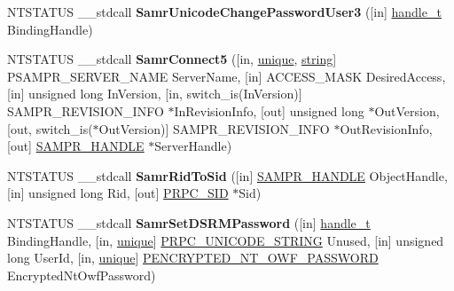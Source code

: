 \begin{DoxyCompactItemize}
\item 
\mbox{\label{interfacesamr_a1f6cdc67440027ac7df65a054462f17d}} 
N\+T\+S\+T\+A\+T\+US \+\_\+\+\_\+stdcall {\bfseries Samr\+Unicode\+Change\+Password\+User3} (\mbox{[}in\mbox{]} \hyperlink{interfacevoid}{handle\+\_\+t} Binding\+Handle)
\item 
\mbox{\label{interfacesamr_ae502c2f0359049ce4ec5290164c0fe34}} 
N\+T\+S\+T\+A\+T\+US \+\_\+\+\_\+stdcall {\bfseries Samr\+Connect5} (\mbox{[}in, \hyperlink{interfaceunique}{unique}, \hyperlink{structstring}{string}\mbox{]} P\+S\+A\+M\+P\+R\+\_\+\+S\+E\+R\+V\+E\+R\+\_\+\+N\+A\+ME Server\+Name, \mbox{[}in\mbox{]} A\+C\+C\+E\+S\+S\+\_\+\+M\+A\+SK Desired\+Access, \mbox{[}in\mbox{]} unsigned long In\+Version, \mbox{[}in, switch\+\_\+is(In\+Version)\mbox{]} S\+A\+M\+P\+R\+\_\+\+R\+E\+V\+I\+S\+I\+O\+N\+\_\+\+I\+N\+FO $\ast$In\+Revision\+Info, \mbox{[}out\mbox{]} unsigned long $\ast$Out\+Version, \mbox{[}out, switch\+\_\+is($\ast$Out\+Version)\mbox{]} S\+A\+M\+P\+R\+\_\+\+R\+E\+V\+I\+S\+I\+O\+N\+\_\+\+I\+N\+FO $\ast$Out\+Revision\+Info, \mbox{[}out\mbox{]} \hyperlink{interfacevoid}{S\+A\+M\+P\+R\+\_\+\+H\+A\+N\+D\+LE} $\ast$Server\+Handle)
\item 
\mbox{\label{interfacesamr_a37d1068e6563bb7a4510614b5073812b}} 
N\+T\+S\+T\+A\+T\+US \+\_\+\+\_\+stdcall {\bfseries Samr\+Rid\+To\+Sid} (\mbox{[}in\mbox{]} \hyperlink{interfacevoid}{S\+A\+M\+P\+R\+\_\+\+H\+A\+N\+D\+LE} Object\+Handle, \mbox{[}in\mbox{]} unsigned long Rid, \mbox{[}out\mbox{]} \hyperlink{struct___r_p_c___s_i_d}{P\+R\+P\+C\+\_\+\+S\+ID} $\ast$Sid)
\item 
\mbox{\label{interfacesamr_acec9253433f355871b9968e5c31b26ee}} 
N\+T\+S\+T\+A\+T\+US \+\_\+\+\_\+stdcall {\bfseries Samr\+Set\+D\+S\+R\+M\+Password} (\mbox{[}in\mbox{]} \hyperlink{interfacevoid}{handle\+\_\+t} Binding\+Handle, \mbox{[}in, \hyperlink{interfaceunique}{unique}\mbox{]} \hyperlink{struct___r_p_c___u_n_i_c_o_d_e___s_t_r_i_n_g}{P\+R\+P\+C\+\_\+\+U\+N\+I\+C\+O\+D\+E\+\_\+\+S\+T\+R\+I\+NG} Unused, \mbox{[}in\mbox{]} unsigned long User\+Id, \mbox{[}in, \hyperlink{interfaceunique}{unique}\mbox{]} \hyperlink{struct___e_n_c_r_y_p_t_e_d___l_m___o_w_f___p_a_s_s_w_o_r_d}{P\+E\+N\+C\+R\+Y\+P\+T\+E\+D\+\_\+\+N\+T\+\_\+\+O\+W\+F\+\_\+\+P\+A\+S\+S\+W\+O\+RD} Encrypted\+Nt\+Owf\+Password)
\item 

\end{DoxyCompactItemize}
